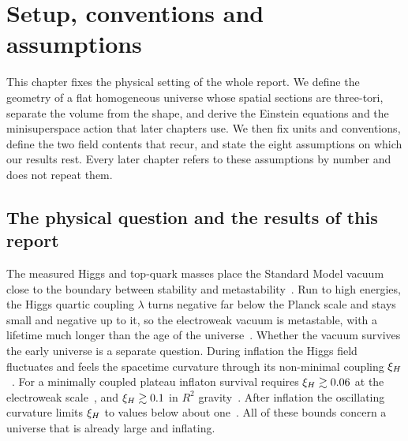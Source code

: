 \newcommand{\rAone}{\mathbf{1}}                          %
\newcommand{\rANeff}{N_C^{\mathrm{eff}}}                 %
\newcommand{\rAgam}{\gamma_C}                            %
\newcommand{\rAVar}{\operatorname{Var}}
\newcommand{\rACov}{\operatorname{Cov}}
\newcommand{\rATm}{\mathcal{T}}                          %
\newcommand{\rAGain}{\mathcal{G}}                        %
\newcommand{\rAHeff}{H_{\mathrm{eff}}}                   %
\newcommand{\rAsh}{\mathrm{sh}}
\renewcommand{\therAassump}{A\arabic{rAassump}}
\newcommand{\rAassume}[1]{\refstepcounter{rAassump}\label{#1}}%
\newtheorem{rAtheorem}{Theorem}[section]
\newtheorem{rAlemma}[rAtheorem]{Lemma}
\newtheorem{rAprop}[rAtheorem]{Proposition}
\newtheorem{rAcor}[rAtheorem]{Corollary}
\newenvironment{rAproof}[1][Proof]{\par\noindent\emph{#1.}\ }{\hfill$\square$\par\medskip}

\section{Setup, conventions and assumptions}\label{rep:setup}

This chapter fixes the physical setting of the whole report.
We define the geometry of a flat homogeneous universe whose spatial sections are three-tori, separate the volume from the shape, and derive the Einstein equations and the minisuperspace action that later chapters use.
We then fix units and conventions, define the two field contents that recur, and state the eight assumptions on which our results rest.
Every later chapter refers to these assumptions by number and does not repeat them.

\subsection{The physical question and the results of this report}
\label{rA:question}

The measured Higgs and top-quark masses place the Standard Model vacuum close to the boundary between stability and metastability~\cite{Degrassi:2012ry,Buttazzo:2013uya,Bednyakov:2015sca,Andreassen:2017rzq}.
Run to high energies, the Higgs quartic coupling $\lambda$ turns negative far below the Planck scale and stays small and negative up to it, so the electroweak vacuum is metastable, with a lifetime much longer than the age of the universe~\cite{Andreassen:2017rzq}.
Whether the vacuum survives the early universe is a separate question.
During inflation the Higgs field fluctuates and feels the spacetime curvature through its non-minimal coupling $\xi_H$~\cite{Espinosa:2007qp,Herranen:2014cua,Kearney:2015vba,Espinosa:2015qea,Joti:2017fwe,Markkanen:2018pdo}.
For a minimally coupled plateau inflaton survival requires $\xi_H\gtrsim0.06$ at the electroweak scale~\cite{Mantziris:2020rzh}, and $\xi_H\gtrsim0.1$ in $R^2$ gravity~\cite{Mantziris:2022fuu}. %
After inflation the oscillating curvature limits $\xi_H$ to values below about one~\cite{Herranen:2015ima}. %
All of these bounds concern a universe that is already large and inflating.

